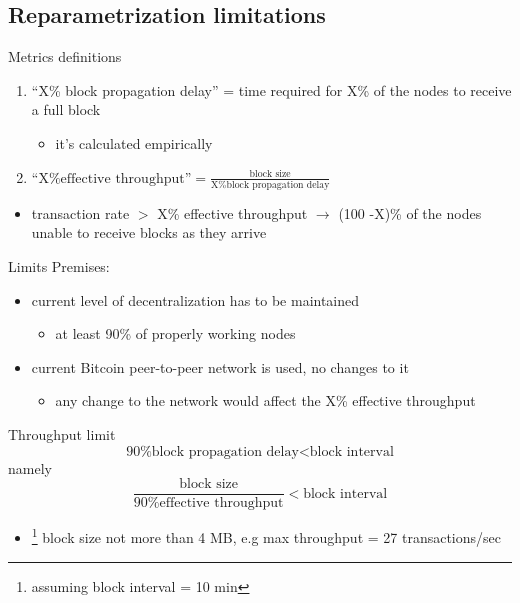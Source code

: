 \documentclass{beamer}
\begin{document}
  \subsection{Reparametrization limitations}
  \begin{frame}{Metrics definitions}
      \begin{enumerate}
          \item ``X\% block propagation delay'' = time required for X\% of the nodes to receive a full block
          \begin{itemize}
              \item[\MVRightarrow] it's calculated empirically
          \end{itemize}
          \item $\text{``X\% effective throughput''} = \frac{\text{block size}}{\text{X\% block propagation delay}}$
      \end{enumerate}
      \begin{itemize}
          \item transaction rate $>$ X\% effective throughput $\rightarrow$ (100 -X)\% of the nodes unable to receive blocks as they arrive
      \end{itemize}
  \end{frame} 
  
  
  \begin{frame}{Limits}
    Premises:
    \begin{itemize}
        \item current level of decentralization has to be maintained 
        \begin{itemize}
            \item[\MVRightarrow] at least 90\% of properly working nodes
        \end{itemize}
        \item current Bitcoin peer-to-peer network is used, no changes to it 
        \begin{itemize}
            \item[\MVRightarrow] any change to the network would affect the X\% effective throughput
        \end{itemize}
    \end{itemize}
    
    \begin{block}{Throughput limit}
        \[ \text{90\% block propagation delay} < \text{block interval} \]
        namely 
        \[ \frac{\text{block size}}{\text{90\% effective throughput}} < \text{block interval} \]
        \begin{itemize}
            \item[\MVRightarrow] \footnote{assuming block interval = 10 min} block size not more than 4 MB, e.g max throughput = 27 transactions/sec 
        \end{itemize}
    \end{block}
  \end{frame}
  
\end{document}
